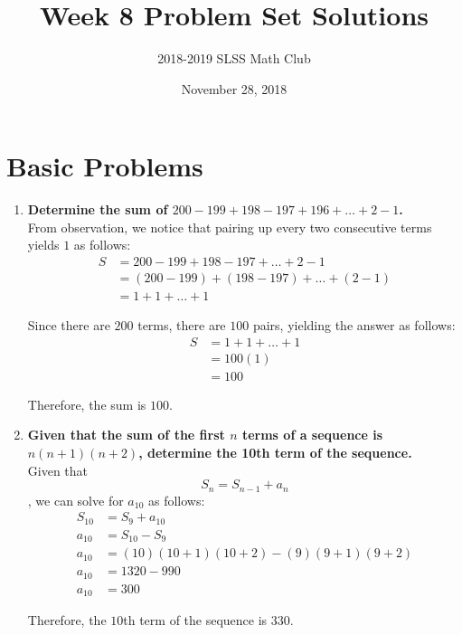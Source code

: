 \documentclass[12pt]{article}
\title{Week 8 Problem Set Solutions \vspace{-3mm}}
\author{2018-2019 SLSS Math Club\vspace{-5mm}}
\date{November 28, 2018\vspace{-5mm}}
\begin{document}
\maketitle

\section*{Basic Problems}
\begin{enumerate}
    \item \textbf{Determine the sum of $200 - 199 + 198 - 197 + 196 + \dots + 2 - 1$.} \\
    
    From observation, we notice that pairing up every two consecutive terms yields $1$ as follows:
    \begin{align*}
        S & = 200 - 199 + 198 - 197 + \dots + 2 - 1 \\
        & = (200 - 199) + (198 - 197) + \dots + (2 - 1) \\
        & = 1 + 1 + \dots + 1
    \end{align*}
    
    Since there are $200$ terms, there are $100 $ pairs, yielding the answer as follows:
    \begin{align*}
        S & = 1 + 1 + \dots + 1 \\
        & = 100(1) \\
        & = 100
    \end{align*}
    
    Therefore, the sum is $100$.
    
    \item \textbf{Given that the sum of the first $n$ terms of a sequence is $n(n + 1)(n + 2)$, determine the 10th term of the sequence.} \\
    
    Given that $$S_n = S_{n - 1} + a_n$$, we can solve for $a_{10}$ as follows:
    \begin{align*}
        S_{10} & = S_{9} + a_{10} \\
        a_{10} & = S_{10} - S_{9} \\
        a_{10} & = (10)(10 + 1)(10 + 2) - (9)(9 + 1)(9 + 2) \\
        a_{10} & = 1320 - 990 \\
        a_{10} & = 300
    \end{align*}
    
    Therefore, the $10$th term of the sequence is $330$.
    
    \newpage
    

\end{enumerate}
\end{document}
